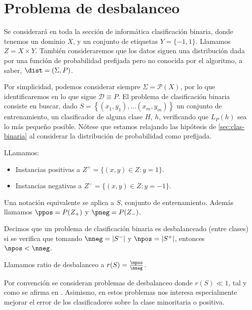 \section{Problema de desbalanceo}
\label{sec:desbalanceo}
Se considerará en toda la sección de informática clasificación binaria, donde tenemos un dominio $X$, y un conjunto de etiquetas 
$Y=\{-1,1\}$. Llamamos $Z = X\times Y$. También consideraremos que los datos siguen una distribución dada por una función de 
probabilidad prefijada pero no conocida por el algoritmo, a saber, $\dist=(\Sigma, P)$. 

Por simplicidad, podemos considerar siempre $\Sigma = \mathcal{P}(X)$, por lo que identificaremos en lo que sigue $\mathcal{D} \equiv P$.
El problema de clasificación binaria consiste en buscar, dado $S= \left\{(x_1, y_1), \ldots (x_m, y_m)\right\}$ un 
conjunto de entrenamiento, un clasificador de alguna clase $H$, $h$, verificando que $L_{P}(h)$ sea lo más pequeño posible.
Nótese que estamos relajando las hipótesis de \ref{sec:clas-binaria} al considerar la distribución de probabilidad como prefijada.

\begin{definition}
LLamamos:
\begin{itemize}
 \item Instancias positivas a $Z^{+} = \{(x,y)\in Z: y=1\}$.
 \item Instancias negativas a $Z^{-} = \{(x,y)\in Z: y=-1\}$.
\end{itemize}
Una notación equivalente se aplica a $S$, conjunto de entrenamiento. Además llamamos $\ppos = P(Z_{+})$ y $\pneg = P(Z_{-})$.
\end{definition}


\begin{definition}
 Decimos que un problema de clasificación binaria es desbalanceado (entre clases) si se verifica que tomando 
 $\nneg = |S^{-}|$ y $\npos = |S^{+}|$, entonces $\npos < \nneg$.
 
 Llamamos ratio de desbalanceo a $r(S)=\frac{\npos}{\nneg}$.
\end{definition}

Por convención se consideran problemas de desbalanceo donde $r(S) \ll 1$, tal y como se afirma en \citep{he2009}. Asimismo,
en estos problemas nos interesa especialmente mejorar el error de los clasificadores sobre la clase minoritaria o positiva.


